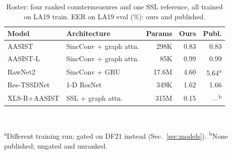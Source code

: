\documentclass[conference]{IEEEtran}
\begin{document}
\begin{table}[!t]
\caption{Roster: four ranked countermeasures and one SSL reference, all
trained on LA19 train. EER on LA19 eval (\%): ours and published.}
\label{tab:roster}
\centering
\footnotesize
\setlength{\tabcolsep}{4pt}
\begin{tabular}{@{}llrrr@{}}
\toprule
Model & Architecture & Params & Ours & Publ. \\
\midrule
AASIST \cite{jung22_aasist}            & SincConv + graph attn. & 298K  & 0.83 & 0.83 \\
AASIST-L \cite{jung22_aasist}          & SincConv + graph attn. & 85K   & 0.99 & 0.99 \\
RawNet2 \cite{tak21_rawnet2}           & SincConv + GRU         & 17.6M & 4.60 & 5.64\textsuperscript{a} \\
Res-TSSDNet \cite{hua21_res_tssdnet}   & 1-D ResNet             & 349K  & 1.62 & 1.66 \\
XLS-R+AASIST \cite{tak22_xlsr_aasist}  & SSL + graph attn.      & 315M  & 0.15 & ---\textsuperscript{b} \\
\bottomrule
\end{tabular}\\[2pt]
\parbox{\columnwidth}{\footnotesize\textsuperscript{a}Different training run;
gated on DF21 instead (Sec.~\ref{sec:models}). \textsuperscript{b}None published;
ungated and unranked.}
\end{table}
\end{document}
